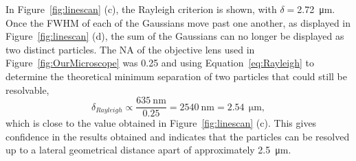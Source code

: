 In Figure~\ref{fig:linescan} (c), the Rayleigh criterion is shown, with
$\delta=$\SI{2.72}{\micro\meter}. Once the FWHM of each of the Gaussians move past one
another, as displayed in Figure~\ref{fig:linescan} (d), the sum of the
Gaussians can no longer be displayed as two distinct particles. The NA of the
objective lens used in Figure~\ref{fig:OurMicroscope} was 0.25
and using
Equation~\ref{eq:Rayleigh} to determine the theoretical minimum
separation of two particles that could still be resolvable,
\begin{equation}
    \delta_{Rayleigh} \propto \frac{635~\mathrm{nm}}{0.25} = 2540~\mathrm{nm} =
    2.54~\mathrm{\SI{}{\micro\meter}} ,
\end{equation}
which is close to the value obtained in Figure~\ref{fig:linescan} (c).
This gives confidence in the results obtained and indicates that the particles
can be resolved up to a lateral
geometrical distance apart of approximately
\SI{2.5}{\micro\meter}.






%
%
%
